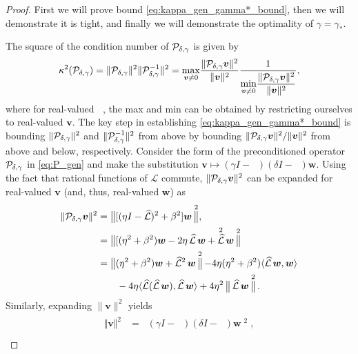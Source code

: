 \documentclass[review]{siamart}
\DeclareMathOperator{\cL}{\widehat{\mathcal{L}}}
\DeclareMathOperator{\cLs}{\widehat{\mathcal{L}}^2}
\DeclareMathOperator{\bVert}{\big\Vert}
\begin{document}
\begin{proof}
First we will prove bound \eqref{eq:kappa_gen_gamma*_bound}, then we will demonstrate it is tight, and finally we will demonstrate the optimality of $\gamma=\gamma_*$.

The square of the condition number of ${\cal P}_{\delta, \gamma}$ is given by
%
\begin{align}
\label{eq:kappa_gen_def}
\kappa^2({\cal P}_{\delta,\gamma}) 
= 
\Vert {\cal P}_{\delta,\gamma} \Vert^2 
\Vert {\cal P}_{\delta,\gamma}^{-1} \Vert^2
=
\underset{{\bm{v} \neq 0}}{\max} \frac{\Vert {\cal P}_{\delta,\gamma} \bm{v} \Vert^2 }{\Vert \bm{v} \Vert^2} 
\frac{1}{\displaystyle{\underset{{\bm{v} \neq 0}}{\min} \frac{\Vert {\cal P}_{\delta,\gamma} \bm{v} \Vert^2 }{\Vert \bm{v} \Vert^2}}},
\end{align}
%
where for real-valued $\cL$, the max and min can be obtained by restricting ourselves
to real-valued $\bm{v}$. The key step in establishing \eqref{eq:kappa_gen_gamma*_bound} is bounding
$\Vert {\cal P}_{\delta,\gamma} \Vert^2$ and $\Vert {\cal P}_{\delta,\gamma}^{-1} \Vert^2$ from above
by bounding $\Vert {\cal P}_{\delta,\gamma} \bm{v} \Vert^2 / \Vert \bm{v} \Vert^2$
from above and below, respectively.
%
Consider the form of the preconditioned operator ${\cal P}_{\delta,\gamma}$ in
\eqref{eq:P_gen} and make the substitution $\bm{v} \mapsto (\gamma I - \cL) (\delta I - \cL) \bm{w}$.
Using the fact that rational functions of $\mathcal{L}$ commute,
$\|{\cal P}_{\delta,\gamma} \bm{v}\|^2$ can be expanded for real-valued
$\bm{v}$ (and, thus, real-valued $\bm{w}$) as
%
\begin{align}
\label{eq:norm_Pv_gen}
\begin{split}
\Vert {\cal P}_{\delta, \gamma} \bm{v} \Vert^2 &= 
	\bVert [( \eta I - \cL)^2 + \beta^2] \bm{w} \bVert^2, \\
& = \bVert [(\eta^2+\beta^2)\bm{w} - 2\eta\cL\bm{w} + \cL^2\bm{w} \bVert^2 \\
&= \bVert (\eta^2 + \beta^2) \bm{w} + \cLs \bm{w} \bVert^2  
	-4 \eta (\eta^2 +\beta^2) \langle \cL \bm{w}, \bm{w} \rangle 
	\\&\quad\quad	
	-4 \eta \langle \cL (\cL \bm{w}), \cL \bm{w} \rangle
	+4 \eta^2 \bVert \cL \bm{w} \bVert^2.
\end{split}
\end{align}
%
Similarly, expanding $\|\bm{v}\|^2$ yields
%
\begin{align}
\label{eq:norm_v_gen}
\begin{split}
\Vert \bm{v} \Vert^2
&= \bVert ( \gamma I - \cL) ( \delta I - \cL) \bm{w} \bVert^2, \\

\end{split}
\end{align}
\end{proof}
\end{document}
